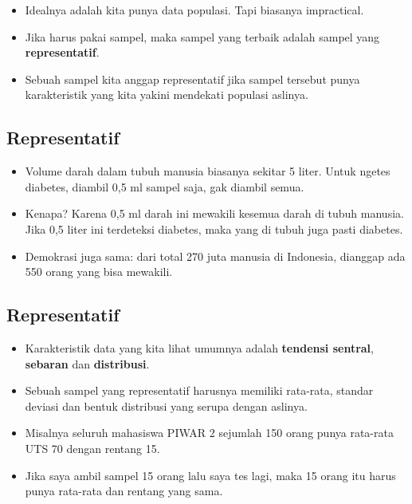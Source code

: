 \documentclass[
  letterpaper,
  DIV=11,
  numbers=noendperiod]{scrartcl}
\begin{document}
\begin{itemize}
\item
  Idealnya adalah kita punya data populasi. Tapi biasanya impractical.
\item
  Jika harus pakai sampel, maka sampel yang terbaik adalah sampel yang
  \textbf{representatif}.
\item
  Sebuah sampel kita anggap representatif jika sampel tersebut punya
  karakteristik yang kita yakini mendekati populasi aslinya.
\end{itemize}

\hypertarget{representatif}{%
\subsection{Representatif}\label{representatif}}

\begin{itemize}
\item
  Volume darah dalam tubuh manusia biasanya sekitar 5 liter. Untuk
  ngetes diabetes, diambil 0,5 ml sampel saja, gak diambil semua.
\item
  Kenapa? Karena 0,5 ml darah ini mewakili kesemua darah di tubuh
  manusia. Jika 0,5 liter ini terdeteksi diabetes, maka yang di tubuh
  juga pasti diabetes.
\item
  Demokrasi juga sama: dari total 270 juta manusia di Indonesia,
  dianggap ada 550 orang yang bisa mewakili.
\end{itemize}

\hypertarget{representatif-1}{%
\subsection{Representatif}\label{representatif-1}}

\begin{itemize}
\item
  Karakteristik data yang kita lihat umumnya adalah \textbf{tendensi
  sentral}, \textbf{sebaran} dan \textbf{distribusi}.
\item
  Sebuah sampel yang representatif harusnya memiliki rata-rata, standar
  deviasi dan bentuk distribusi yang serupa dengan aslinya.
\item
  Misalnya seluruh mahasiswa PIWAR 2 sejumlah 150 orang punya rata-rata
  UTS 70 dengan rentang 15.
\item
  Jika saya ambil sampel 15 orang lalu saya tes lagi, maka 15 orang itu
  harus punya rata-rata dan rentang yang sama.
\end{itemize}
\end{document}
